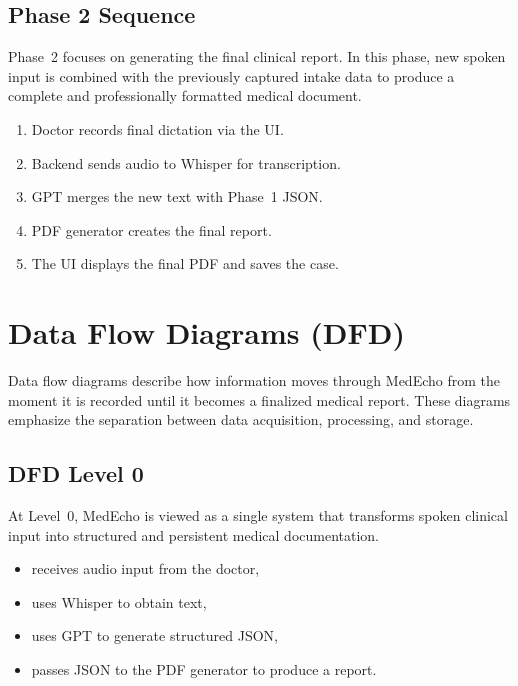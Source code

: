 \subsection*{Phase 2 Sequence}



Phase~2 focuses on generating the final clinical report. In this phase, new spoken input is combined with the previously captured intake data to produce a complete and professionally formatted medical document.


\begin{enumerate}
    \item Doctor records final dictation via the UI.
    \item Backend sends audio to Whisper for transcription.
    \item GPT merges the new text with Phase~1 JSON.
    \item PDF generator creates the final report.
    \item The UI displays the final PDF and saves the case.
\end{enumerate}




\section{Data Flow Diagrams (DFD)}\label{sec:analysis:dfd}

Data flow diagrams describe how information moves through MedEcho from the moment it is recorded until it becomes a finalized medical report. These diagrams emphasize the separation between data acquisition, processing, and storage.

\subsection*{DFD Level 0}



At Level~0, MedEcho is viewed as a single system that transforms spoken clinical input into structured and persistent medical documentation.

\begin{itemize}
    \item receives audio input from the doctor,
    \item uses Whisper to obtain text,
    \item uses GPT to generate structured JSON,
    \item passes JSON to the PDF generator to produce a report.
\end{itemize}

